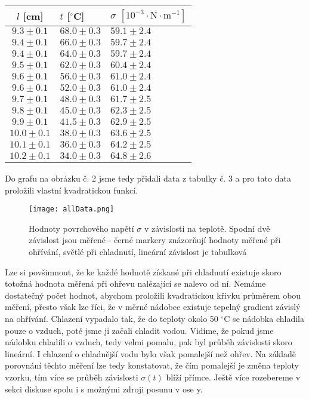 \documentclass[a4paper]{article}
\begin{document}
\begin{center}
    \label{tab:title}
    \begin{tabular}{ | c | l |   p{3cm} |} \hline
    $l$ [cm] & $t$ [$^\circ$C] & $\sigma$ $\mathrm{[ 10^{-3} \cdot N \cdot m^{-1}]}$  \\ \hline
    $9.3\pm0.1$  & $68.0\pm0.3$   & $59.1\pm2.4$ \\ \hline
    $9.4\pm0.1$  & $66.0\pm0.3$   & $59.7\pm2.4$ \\ \hline
    $9.4\pm0.1$  & $64.0\pm0.3$   & $59.7\pm2.4$ \\ \hline
    $9.5\pm0.1$  & $62.0\pm0.3$   & $60.4\pm2.4$ \\ \hline
    $9.6\pm0.1$  & $56.0\pm0.3$   & $61.0\pm2.4$ \\ \hline 
    $9.6\pm0.1$  & $52.0\pm0.3$   & $61.0\pm2.4$ \\ \hline
    $9.7\pm0.1$  & $48.0\pm0.3$   & $61.7\pm2.5$ \\ \hline
    $9.8\pm0.1$  & $45.0\pm0.3$   & $62.3\pm2.5$ \\ \hline
    $9.9\pm0.1$  & $41.5\pm0.3$   & $62.9\pm2.5$ \\ \hline
    $10.0\pm0.1$ & $38.0\pm0.3$   & $63.6\pm2.5$ \\ \hline
    $10.1\pm0.1$ & $36.0\pm0.3$   & $64.2\pm2.5$ \\ \hline
    $10.2\pm0.1$ & $34.0\pm0.3$   & $64.8\pm2.6$ \\ \hline
    \end{tabular}
\end{center}
\par Do grafu na obrázku č. 2 jsme tedy přidali data z tabulky č. 3 a pro tato data proložili vlastní kvadratickou funkcí.
\begin{figure}[H]
\centering
\texttt{[image: allData.png]}
\caption{Hodnoty povrchového napětí $\sigma$ v závislosti na teplotě. Spodní dvě závislost jsou měřené - černé markery znázorňují hodnoty měřené při ohřívání, světlé při chladnutí, lineární závislost je tabulková}
\end{figure}
\par Lze si povšimnout, že ke každé hodnotě získané při chladnutí existuje skoro totožná hodnota měřená při ohřevu nalézající se nalevo od ní. Nemáme dostatečný počet hodnot, abychom proložili kvadratickou křivku průměrem obou měření, přesto však lze říci, že v měrné nádobce existuje tepelný gradient závislý na ohřívání. Chlazení vypadalo tak, že do teploty okolo 50 $^\circ$C se nádobka chladila pouze o vzduch, poté jsme ji začali chladit vodou. Vidíme, že pokud jsme nádobku chladili o vzduch, tedy velmi pomalu, pak byl průběh závislosti skoro lineární. I chlazení o chladnější vodu bylo však pomalejší než ohřev. Na základě porovnání těchto měření lze tedy konstatovat, že čím pomalejší je změna teploty vzorku, tím více se průběh závislosti $\sigma(t)$ blíží přímce. Ještě více rozebereme v sekci diskuse spolu i s možnými zdroji posunu v ose y.
\end{document}
